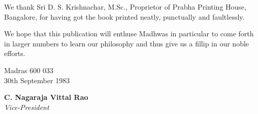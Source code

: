 We thank Sri D. S. Krishnachar, M.Sc., Proprietor of Prabha Printing House, Bangalore, for having got the book printed neatly, punctually and faultlessly.

We hope that this publication will enthuse Madhwas in particular to come forth in larger numbers to learn our philosophy and thus give us a fillip in our noble efforts.

\noindent
Madras 600 033\\ 30th September 1983

\begin{flushright}
\textbf{C. Nagaraja Vittal Rao}\\\textit{Vice-President}
\end{flushright}

